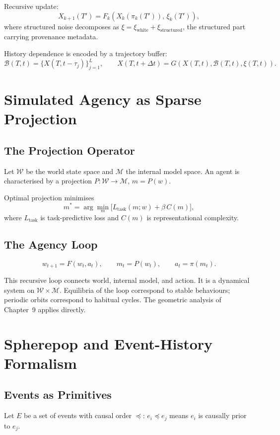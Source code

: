 \documentclass[11pt, openany]{book}
\theoremstyle{plain}
\theoremstyle{definition}
\theoremstyle{remark}
\begin{document}
Recursive update:
\[
  X_{k+1}(T')=F_k\!\left(X_k(\pi_k(T')),\,\xi_k(T')\right),
\]
where structured noise decomposes as
$\xi=\xi_\text{white}+\xi_\text{structured}$,
the structured part carrying provenance metadata.

History dependence is encoded by a trajectory buffer:
\[
  \mathcal{B}(T,t)=\{X(T,t-\tau_j)\}_{j=1}^L,\qquad
  X(T,t+\Delta t)=G\!\left(X(T,t),\mathcal{B}(T,t),\xi(T,t)\right).
\]

\chapter{Simulated Agency as Sparse Projection}

\section{The Projection Operator}

Let $\mathcal{W}$ be the world state space and $\mathcal{M}$ the internal
model space. An agent is characterised by a projection
$P:\mathcal{W}\to\mathcal{M}$, $m=P(w)$.

Optimal projection minimises
\[
  m^* = \arg\min_m\bigl[L_\text{task}(m;w)+\beta\,C(m)\bigr],
\]
where $L_\text{task}$ is task-predictive loss and $C(m)$ is representational
complexity.

\section{The Agency Loop}

\[
  w_{t+1}=F(w_t,a_t),\qquad
  m_t=P(w_t),\qquad
  a_t=\pi(m_t).
\]

This recursive loop connects world, internal model, and action. It is a
dynamical system on $\mathcal{W}\times\mathcal{M}$. Equilibria of the loop
correspond to stable behaviours; periodic orbits correspond to habitual
cycles. The geometric analysis of Chapter~9 applies directly.

\chapter{Spherepop and Event-History Formalism}

\section{Events as Primitives}

Let $E$ be a set of events with causal order $\preceq$: $e_i\preceq e_j$
means $e_i$ is causally prior to $e_j$.
\end{document}
